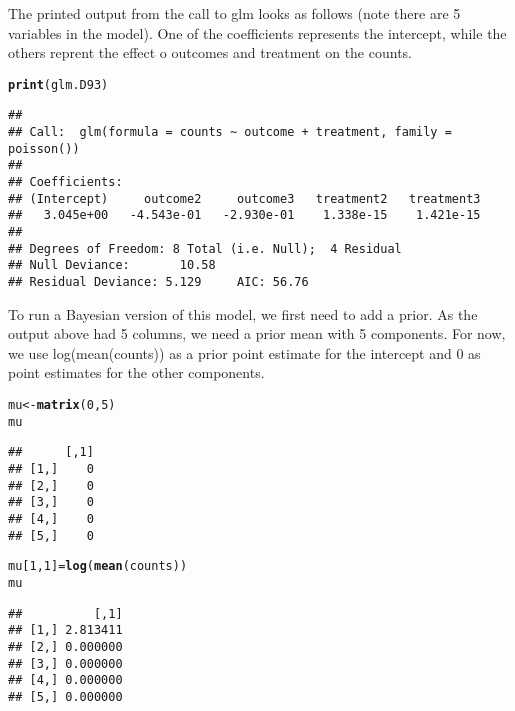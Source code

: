 \documentclass{article}\usepackage[]{graphicx}\usepackage[]{color}
\makeatletter
\newcommand{\hlnum}[1]{\textcolor[rgb]{0.686,0.059,0.569}{#1}}%
\newcommand{\hlstd}[1]{\textcolor[rgb]{0.345,0.345,0.345}{#1}}%
\newcommand{\hlkwb}[1]{\textcolor[rgb]{0.69,0.353,0.396}{#1}}%
\newcommand{\hlkwd}[1]{\textcolor[rgb]{0.737,0.353,0.396}{\textbf{#1}}}%
\newenvironment{kframe}{%
 \def\at@end@of@kframe{}%
 \ifinner\ifhmode%
  \def\at@end@of@kframe{\end{minipage}}%
  \begin{minipage}{\columnwidth}%
 \fi\fi%
 \def\FrameCommand##1{\hskip\@totalleftmargin \hskip-\fboxsep
 \colorbox{shadecolor}{##1}\hskip-\fboxsep
     \hskip-\linewidth \hskip-\@totalleftmargin \hskip\columnwidth}%
 \MakeFramed {\advance\hsize-\width
   \@totalleftmargin\z@ \linewidth\hsize
   \@setminipage}}%
 {\par\unskip\endMakeFramed%
 \at@end@of@kframe}
\newenvironment{knitrout}{}{} %
\makeatother
\begin{document}
The printed output from the call to glm looks as follows (note there are 5 variables in the model). One of the coefficients represents the intercept, while the others reprent the effect o
outcomes and treatment on the counts.

\begin{knitrout}
\color{fgcolor}\begin{kframe}
\begin{alltt}
\hlkwd{print}\hlstd{(glm.D93)}
\end{alltt}
\begin{verbatim}
## 
## Call:  glm(formula = counts ~ outcome + treatment, family = poisson())
## 
## Coefficients:
## (Intercept)     outcome2     outcome3   treatment2   treatment3  
##   3.045e+00   -4.543e-01   -2.930e-01    1.338e-15    1.421e-15  
## 
## Degrees of Freedom: 8 Total (i.e. Null);  4 Residual
## Null Deviance:	    10.58 
## Residual Deviance: 5.129 	AIC: 56.76
\end{verbatim}
\end{kframe}
\end{knitrout}

To run a Bayesian version of this model, we first need to add a prior.  As the output above had 5 columns, we need a prior mean with 5 components. For now, we use log(mean(counts)) as a prior
point estimate for the intercept and 0 as point estimates for the other components. 

\begin{knitrout}
\color{fgcolor}\begin{kframe}
\begin{alltt}
\hlstd{mu}\hlkwb{<-}\hlkwd{matrix}\hlstd{(}\hlnum{0}\hlstd{,}\hlnum{5}\hlstd{)}
\hlstd{mu}
\end{alltt}
\begin{verbatim}
##      [,1]
## [1,]    0
## [2,]    0
## [3,]    0
## [4,]    0
## [5,]    0
\end{verbatim}
\begin{alltt}
\hlstd{mu[}\hlnum{1}\hlstd{,}\hlnum{1}\hlstd{]}\hlkwb{=}\hlkwd{log}\hlstd{(}\hlkwd{mean}\hlstd{(counts))}
\hlstd{mu}
\end{alltt}
\begin{verbatim}
##          [,1]
## [1,] 2.813411
## [2,] 0.000000
## [3,] 0.000000
## [4,] 0.000000
## [5,] 0.000000
\end{verbatim}
\end{kframe}
\end{knitrout}
\end{document}
